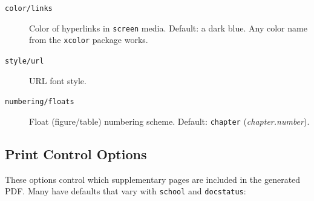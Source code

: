 \begin{description}
  \item[\texttt{color/links}] Color of hyperlinks in \texttt{screen} media.
    Default: a dark blue.  Any color name from the
    \texttt{xcolor} package works.
\begin{latexcode}
\end{latexcode}

  \item[\texttt{style/url}] URL font style.
\begin{latexcode}
\end{latexcode}

  \item[\texttt{numbering/floats}] Float (figure/table) numbering scheme.
    Default: \texttt{chapter} (\emph{chapter.number}).
\begin{latexcode}
\end{latexcode}
\end{description}

\subsection{Print Control Options}
\label{sub:print_options}

These options control which supplementary pages are included in the
generated PDF.  Many have defaults that vary with \texttt{school} and \texttt{docstatus}:


